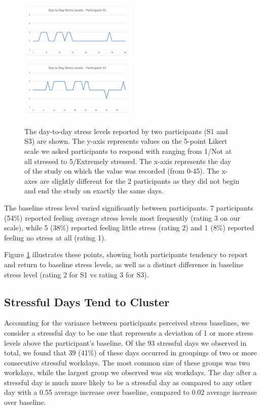 \begin{figure}
  \centering
      \includegraphics[width=0.5\textwidth]{dailystress_s1.pdf}
      \includegraphics[width=0.5\textwidth]{dailystress_s3.pdf}
  \caption{The day-to-day stress levels reported by two participants (S1 and S3) are shown. The y-axis represents values on the 5-point Likert scale we asked participants to respond with ranging from 1/Not at all stressed to 5/Extremely stressed. The x-axis represents the day of the study on which the value was recorded (from 0-45). The x-axes are slightly different for the 2 participants as they did not begin and end the study on exactly the same days.}
   \vspace*{-2mm}
   \label{fig:dailyStress}
\end{figure}

The baseline stress level varied significantly between participants. 7
participants (54\%) reported feeling average stress levels most frequently
(rating 3 on our scale), while 5 (38\%) reported feeling little stress
(rating 2) and 1 (8\%) reported feeling no stress at all (rating 1).

Figure \ref{fig:dailyStress} illustrates these points, showing both participants tendency to report and return to baseline stress levels, as well
as a distinct difference in baseline stress level (rating 2 for S1 vs rating 3 for S3).

\subsection{Stressful Days Tend to Cluster}
Accounting for the variance between participants perceived stress
baselines, we consider a stressful day to be one that represents a
deviation of 1 or more stress levels above the participant's
baseline. Of the 93 stressful days we observed in total, we found that
39 (41\%) of these days occurred in groupings of two or more
consecutive stressful workdays. The most common size of these groups
was two workdays, while the largest group we observed was six
workdays.  The day after a stressful day is much more likely to be a
stressful day as compared to any other day with a 0.55 average increase
over baseline, compared to 0.02 average increase over baseline.

